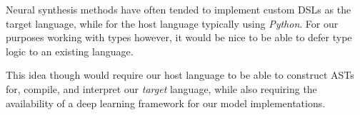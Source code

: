 \documentclass{article}
\begin{document}
Neural synthesis methods have often tended to implement custom DSLs as the target language,
while for the host language typically using \emph{Python}.
For our purposes working with types however,
it would be nice to be able to defer type logic to an existing language.%

This idea though would require our host language
to be able to construct ASTs for, compile,
and interpret our \emph{target} language,
while also requiring the availability of a
deep learning framework for our model implementations.

\end{document}
